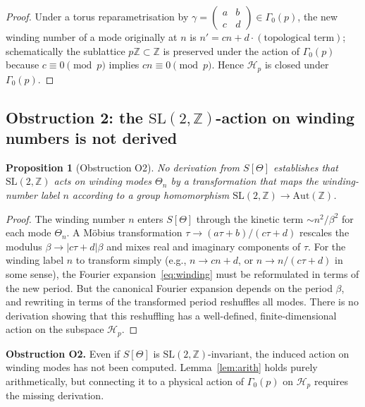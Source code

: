 \documentclass[12pt,a4paper]{article}
\newtheorem{proposition}[theorem]{Proposition}
\theoremstyle{definition}
\theoremstyle{remark}
\newcommand{\SL}{\mathrm{SL}}
\newcommand{\ZZ}{\mathbb{Z}}
\newcommand{\Gam}{\Gamma}
\newcommand{\Hp}{\mathcal{H}_p}
\begin{document}
\begin{proof}
Under a torus reparametrisation by
$\gamma=\left(\begin{smallmatrix}a&b\\c&d\end{smallmatrix}\right)
\in\Gam_0(p)$, the new winding number of a mode originally at $n$ is
$n'=cn+d\cdot(\text{topological term})$; schematically the sublattice
$p\ZZ\subset\ZZ$ is preserved under the action of $\Gam_0(p)$ because
$c\equiv 0\pmod{p}$ implies $cn\equiv 0\pmod{p}$.  Hence $\Hp$ is
closed under $\Gam_0(p)$.
\end{proof}

\subsection{Obstruction 2: the $\SL(2,\ZZ)$-action on winding numbers
is not derived}

\begin{proposition}[Obstruction O2]
\label{prop:O2}
No derivation from $S[\Theta]$ establishes that $\SL(2,\ZZ)$ acts on
winding modes $\Theta_n$ by a transformation that maps the winding-number
label $n$ according to a group homomorphism $\SL(2,\ZZ)\to\mathrm{Aut}(\ZZ)$.
\end{proposition}

\begin{proof}
The winding number $n$ enters $S[\Theta]$ through the kinetic term
$\sim n^2/\beta^2$ for each mode $\Theta_n$.  A Möbius transformation
$\tau\to(a\tau+b)/(c\tau+d)$ rescales the modulus $\beta\to|c\tau+d|\beta$
and mixes real and imaginary components of $\tau$.  For the winding label
$n$ to transform simply (e.g., $n\to cn+d$, or $n\to n/(c\tau+d)$ in some
sense), the Fourier expansion~\eqref{eq:winding} must be reformulated in
terms of the new period.  But the canonical Fourier expansion depends on
the period $\beta$, and rewriting in terms of the transformed period
reshuffles all modes.  There is no derivation showing that this reshuffling
has a well-defined, finite-dimensional action on the subspace $\Hp$.
\end{proof}

\begin{gapbox}
\textbf{Obstruction O2.} Even if $S[\Theta]$ is $\SL(2,\ZZ)$-invariant,
the induced action on winding modes has not been computed.  Lemma~\ref{lem:arith}
holds purely arithmetically, but connecting it to a physical action of
$\Gam_0(p)$ on $\Hp$ requires the missing derivation.
\end{gapbox}
\end{document}

